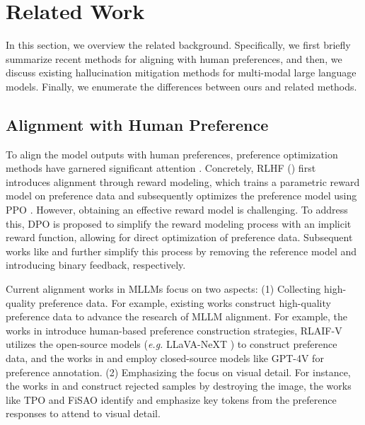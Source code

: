 \section{Related Work}
\label{sec:related_work}

In this section, we overview the related background. Specifically, we first briefly summarize recent methods for aligning with human preferences, and then, we discuss existing hallucination mitigation methods for multi-modal large language models. Finally, we enumerate the differences between ours and related methods.

\subsection{Alignment with Human Preference}
To align the model outputs with human preferences, preference optimization methods have garnered significant attention \cite{rlhf, DPO, SimPO}. Concretely, RLHF (\cite{rlhf}) first introduces alignment through reward modeling, which trains a parametric reward model on preference data and subsequently optimizes the preference model using PPO \cite{PPO}. 
However, obtaining an effective reward model is challenging. To address this,  DPO \cite{DPO} is proposed to simplify the reward modeling process with an implicit reward function, allowing for direct optimization of preference data. Subsequent works like \cite{SimPO} and \cite{KTO} further simplify this process by removing the reference model and introducing binary feedback, respectively.

Current alignment works in MLLMs focus on two aspects:
(1) Collecting high-quality preference data. For example, existing works \cite{RLHF-V, RLAIF-V, VLFeedback} construct high-quality preference data to advance the research of MLLM alignment. For example, the works in \cite{RLHF-V, LLaVA-RLHF} introduce human-based preference construction strategies, RLAIF-V \cite{RLAIF-V} utilizes the open-source models (\textit{e.g.} LLaVA-NeXT \cite{LLaVA-Next}) to construct preference data, and the works in \cite{VLFeedback} and \cite{MAVIS} employ closed-source models like GPT-4V for preference annotation.
(2) Emphasizing the focus on visual detail. For instance, the works in \cite{V-dpo} and \cite{mDPO} construct rejected samples by destroying the image, the works like TPO \cite{TPO} and FiSAO \cite{FiSAO} identify and emphasize key tokens from the preference responses to attend to visual detail.

